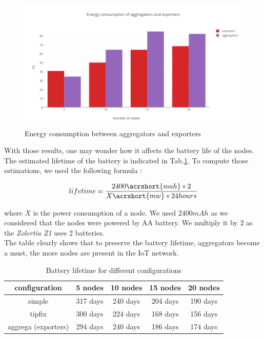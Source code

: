 \begin{figure}[h]
  \includegraphics[width=\textwidth]{res/energy_aggrega}
  \caption{Energy consumption between aggregators and exporters}
  \label{fig:aggrega_energy}
\end{figure}

With those results, one may wonder how it affects the battery life of the nodes. The estimated lifetime of the battery is indicated in Tab.\ref{tab:battery_lifetime}. To compute those estimations, we used the following formula :

\begin{equation}
  lifetime = \frac{2400 \acrshort{mah} * 2}{X \acrshort{mw} * 24 hours}
\end{equation}

where $X$ is the power consumption of a node. We used $2400mAh$ as we considered that the nodes were powered by AA battery. We multiply it by $2$ as the \textit{Zolertia Z1} uses 2 batteries. \\

The table clearly shows that to preserve the battery lifetime, aggregators become a must, the more nodes are present in the IoT network.

\begin{table}
  \centering
  \begin{tabular}{|c|c|c|c|c|}
    \hline
    configuration & 5 nodes & 10 nodes & 15 nodes & 20 nodes \\
    \hline
    simple & 317 days & 240 days & 204 days & 190 days\\
    \hline
    tipfix & 300 days & 224 days & 168 days & 156 days\\
    \hline
    aggrega (exporters) & 294 days & 240 days & 186 days & 174 days \\
    \hline
  \end{tabular}
  \caption{Battery lifetime for different configurations}
  \label{tab:battery_lifetime}
\end{table}

